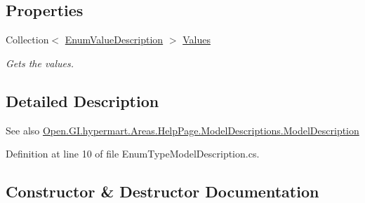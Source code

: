 \subsection*{Properties}
\begin{DoxyCompactItemize}
\item 
Collection$<$ \hyperlink{class_open_1_1_g_i_1_1hypermart_1_1_areas_1_1_help_page_1_1_model_descriptions_1_1_enum_value_description}{Enum\+Value\+Description} $>$ \hyperlink{class_open_1_1_g_i_1_1hypermart_1_1_areas_1_1_help_page_1_1_model_descriptions_1_1_enum_type_model_description_a7b42c1652865a638dd214ba6a1642819}{Values}
\begin{DoxyCompactList}\small\item\em Gets the values. \end{DoxyCompactList}\end{DoxyCompactItemize}


\subsection{Detailed Description}


\begin{DoxySeeAlso}{See also}
\hyperlink{class_open_1_1_g_i_1_1hypermart_1_1_areas_1_1_help_page_1_1_model_descriptions_1_1_model_description}{Open.\+G\+I.\+hypermart.\+Areas.\+Help\+Page.\+Model\+Descriptions.\+Model\+Description}


\end{DoxySeeAlso}


Definition at line 10 of file Enum\+Type\+Model\+Description.\+cs.



\subsection{Constructor \& Destructor Documentation}
\hypertarget{class_open_1_1_g_i_1_1hypermart_1_1_areas_1_1_help_page_1_1_model_descriptions_1_1_enum_type_model_description_a77a337dadd9fdcee12869c7385bf51dc}{}
